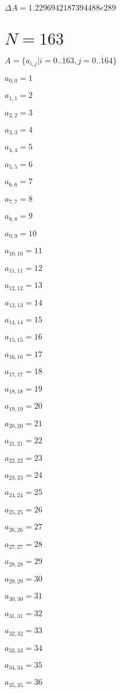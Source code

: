 \documentclass[a4paper,12pt]{article}
\begin{document}
$\Delta A = 1.2296942187394488e289$



\section{ $N = 163$ }
$A = \{ a _{ i, j } | i = \overline { 0..163 }, j = \overline { 0..164 } \}$

$a _{ 0, 0 } = 1$

$a _{ 1, 1 } = 2$

$a _{ 2, 2 } = 3$

$a _{ 3, 3 } = 4$

$a _{ 4, 4 } = 5$

$a _{ 5, 5 } = 6$

$a _{ 6, 6 } = 7$

$a _{ 7, 7 } = 8$

$a _{ 8, 8 } = 9$

$a _{ 9, 9 } = 10$

$a _{ 10, 10 } = 11$

$a _{ 11, 11 } = 12$

$a _{ 12, 12 } = 13$

$a _{ 13, 13 } = 14$

$a _{ 14, 14 } = 15$

$a _{ 15, 15 } = 16$

$a _{ 16, 16 } = 17$

$a _{ 17, 17 } = 18$

$a _{ 18, 18 } = 19$

$a _{ 19, 19 } = 20$

$a _{ 20, 20 } = 21$

$a _{ 21, 21 } = 22$

$a _{ 22, 22 } = 23$

$a _{ 23, 23 } = 24$

$a _{ 24, 24 } = 25$

$a _{ 25, 25 } = 26$

$a _{ 26, 26 } = 27$

$a _{ 27, 27 } = 28$

$a _{ 28, 28 } = 29$

$a _{ 29, 29 } = 30$

$a _{ 30, 30 } = 31$

$a _{ 31, 31 } = 32$

$a _{ 32, 32 } = 33$

$a _{ 33, 33 } = 34$

$a _{ 34, 34 } = 35$

$a _{ 35, 35 } = 36$
\end{document}
